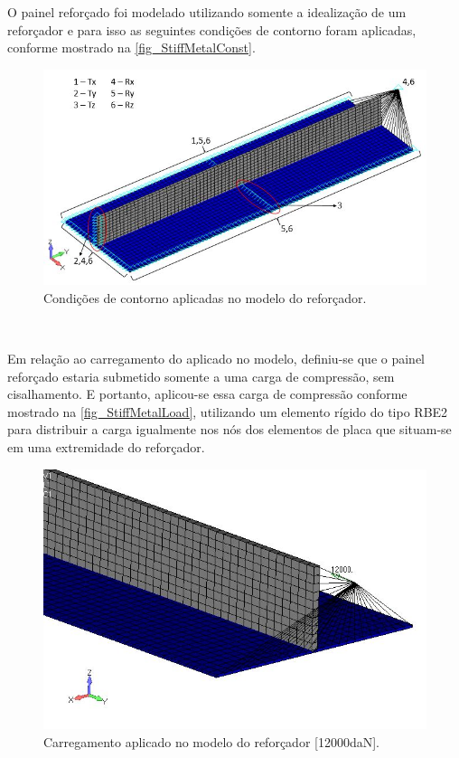 {O painel reforçado foi modelado utilizando somente a idealização de um reforçador e para isso as seguintes condições de contorno foram aplicadas, conforme mostrado na \autoref{fig_StiffMetalConst}.

\begin{figure}[h]
	\caption{\label{fig_StiffMetalConst}Condições de contorno aplicadas no modelo do reforçador.}
  \centering
  \includegraphics[scale=0.7]{figura/StiffMetalConst}
\end{figure}
\

Em relação ao carregamento do aplicado no modelo, definiu-se que o painel reforçado estaria submetido somente a uma carga de compressão, sem cisalhamento. E portanto, aplicou-se essa carga de compressão conforme mostrado na \autoref{fig_StiffMetalLoad},
utilizando um elemento rígido do tipo RBE2 para distribuir a carga igualmente nos nós dos elementos de placa que situam-se em uma extremidade do reforçador.

\begin{figure}[h]
	\caption{\label{fig_StiffMetalLoad}Carregamento aplicado no modelo do reforçador [12000daN].}
  \centering
  \includegraphics[scale=0.7]{figura/StiffMetalLoad}
\end{figure}
\

}
